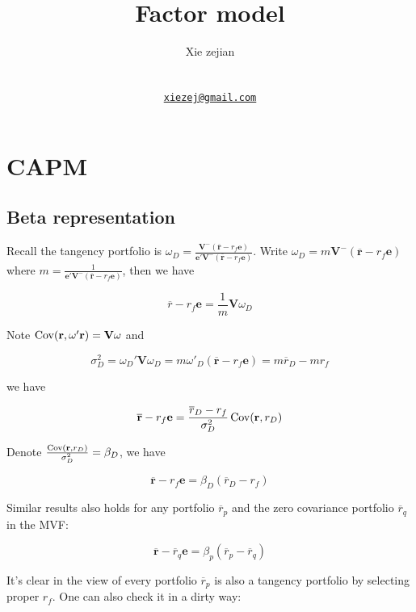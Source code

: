 \documentclass{article}
\title{Factor model}
\author{
    Xie zejian
   \\
     \\
   \\
  \texttt{\href{mailto:xiezej@gmail.com}{\nolinkurl{xiezej@gmail.com}}} \\
  }
\begin{document}
\maketitle

\def\tightlist{}


\begin{abstract}

\end{abstract}


\hypertarget{capm}{%
\section{CAPM}\label{capm}}

\hypertarget{beta-representation}{%
\subsection{Beta representation}\label{beta-representation}}

Recall the tangency portfolio is
\(\omega_D=\frac{\mathbf{V^-}(\overline{\mathbf{r}}-r_f\mathbf{e})}{\mathbf{e'V^-}(\overline{\mathbf{r}}-r_f\mathbf{e})}\).
Write \(\omega_D=m \mathbf{V^-} (\overline{\mathbf{r}}-r_f\mathbf{e})\)
where
\(m=\frac{1}{\mathbf{e'}\mathbf{V^-} (\overline{\mathbf{r}}-r_f\mathbf{e})}\),
then we have

\[ \overline{r}-r_f\mathbf{e}=\frac{1}{m}\mathbf{V}\omega_D \]

Note \(\operatorname{Cov}(\mathbf{r},\omega'\mathbf{r})=\mathbf{V\omega}\) and

\[ \sigma_D^2=\omega_D'\mathbf{V}\omega_D=m\omega'_D(\overline{\mathbf{r}}-r_f\mathbf{e})= m\overline{r}_D-mr_f \]

we have

\[ \overline{\mathbf{r}}-r_f\mathbf{e}=\frac{\overline{r}_D-r_f}{\sigma_D^2}\operatorname{Cov}(\mathbf{r},{r_D}) \]

Denote \(\frac{\operatorname{Cov}(\mathbf{r},r_D)}{\sigma_D^2}=\beta_D\), we have

\[ \overline{\mathbf{r}}-r_f\mathbf{e}=\beta_D({\overline{r}_D-r_f}) \]

Similar results also holds for any portfolio \(\overline{r}_p\) and the
zero covariance portfolio \(\overline{r}_q\) in the MVF:

\[ \overline{\mathbf{r}}-\overline{r}_q\mathbf{e}=\beta_p(\overline{r}_p-\overline{r}_q) \]

It's clear in the view of every portfolio \(\overline{r}_p\) is also a
tangency portfolio by selecting proper \(r_f\). One can also check it in
a dirty way:
\end{document}
